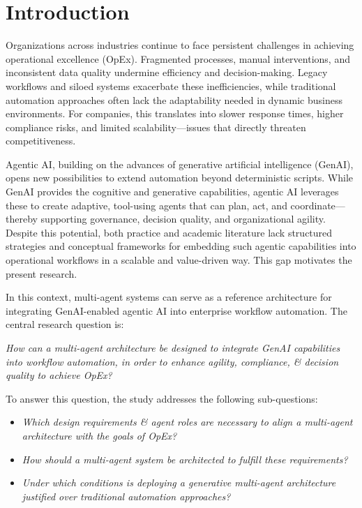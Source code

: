 \section{Introduction}\label{sec:intro}
Organizations across industries continue to face persistent challenges in achieving operational excellence (OpEx). Fragmented processes, manual interventions, and inconsistent data quality undermine efficiency and decision-making. Legacy workflows and siloed systems exacerbate these inefficiencies, while traditional automation approaches often lack the adaptability needed in dynamic business environments. For companies, this translates into slower response times, higher compliance risks, and limited scalability—issues that directly threaten competitiveness.

Agentic AI, building on the advances of generative artificial intelligence (GenAI), opens new possibilities to extend automation beyond deterministic scripts. While GenAI provides the cognitive and generative capabilities, agentic AI leverages these to create adaptive, tool-using agents that can plan, act, and coordinate—thereby supporting governance, decision quality, and organizational agility. Despite this potential, both practice and academic literature lack structured strategies and conceptual frameworks for embedding such agentic capabilities into operational workflows in a scalable and value-driven way. This gap motivates the present research.

In this context, multi-agent systems can serve as a reference architecture for integrating GenAI-enabled agentic AI into enterprise workflow automation. The central research question is:

\vspace{0.5\baselineskip}
\emph{How can a multi-agent architecture be designed to integrate GenAI capabilities into workflow automation, in order to enhance agility, compliance, \& decision quality to achieve OpEx?}
\vspace{0.5\baselineskip}

To answer this question, the study addresses the following sub-questions:
\begin{itemize}
    \item \emph{Which design requirements \& agent roles are necessary to align a multi-agent architecture with the goals of OpEx?}
    \item \emph{How should a multi-agent system be architected to fulfill these requirements?}
    \item \emph{Under which conditions is deploying a generative multi-agent architecture justified over traditional automation approaches?}
\end{itemize}

